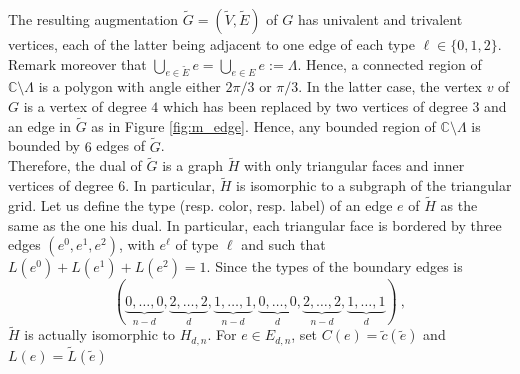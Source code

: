 \documentclass[11pt,a4paper]{amsart}
\numberwithin{equation}{section}
\theoremstyle{definition}
\begin{document}
\noindent
The resulting augmentation $\tilde{G} = (\tilde{V}, \tilde{E})$ of $G$ has univalent and trivalent vertices, 
each of the latter being adjacent to one edge of each type $\ell\in\{0,1,2\}$. 
Remark moreover that $\bigcup_{e\in \tilde{E}}e=\bigcup_{e\in E}e:=\Lambda$. 
Hence, a connected region of $\mathbb{C}\setminus \Lambda$ is a polygon with 
angle either $2\pi/3$ or $\pi/3$. 
In the latter case, the vertex $v$ of $G$ is a vertex of degree $4$ which has 
been replaced by two vertices of degree $3$ 
and an edge in $\tilde{G}$ as in Figure \ref{fig:m_edge}.
Hence, any bounded region of $\mathbb{C}\setminus \Lambda$ is bounded by $6$ edges of $\tilde{G}$.
\\
Therefore, the dual of $\tilde{G}$ is a graph $\tilde{H}$ with only triangular faces 
and inner vertices of degree $6$. 
In particular, $\tilde{H}$ is isomorphic to a subgraph of the triangular grid. 
Let us define the type (resp. color, resp. label) of an edge $e$ of $\tilde{H}$ 
as the same as the one his dual. 
In particular, each triangular face is bordered by three edges $(e^0,e^1,e^2)$, 
with $e^\ell$ of type $\ell$ and such that 
$L(e^0)+L(e^1)+L(e^2)=1$. Since the types of the boundary edges is 
$$(\underset{n-d}{\underbrace{0,\ldots,0}},\underset{d}{\underbrace{2,\ldots,2}}, 
\underset{n-d}{\underbrace{1,\ldots,1}}, 
\underset{d}{\underbrace{0,\ldots,0}},\underset{n-d}{\underbrace{2,\ldots,2}}, 
\underset{d}{\underbrace{1,\ldots,1}}) \ ,$$
$\tilde{H}$ is actually isomorphic to $H_{d,n}$. For $e\in E_{d,n}$, set 
$C(e) = \tilde{c} (\tilde{e})$ and $L(e)= \tilde{L}(\tilde{e})$
\end{document}
